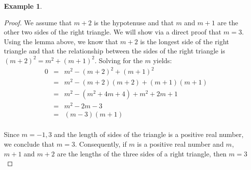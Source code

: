 \documentclass{book}
\theoremstyle{definition}
\newtheorem{example}{Example}[definition]
\theoremstyle{remark}
\begin{document}
\begin{example}
\begin{proof}
    We assume that $m+2$ is the hypotenuse and that $m$ and $m+1$ are the other two sides of the right triangle. We will show via a direct proof that $m=3$. \\
    
    Using the lemma above, we know that $m+2$ is the longest side of the right triangle and that the relationship between the sides of the right triangle is $(m + 2)^2 = m^2 + (m + 1)^2$. Solving for the $m$ yields: \\
    
    \begin{eqnarray}
    	0 & = & m^2 - (m+2)^2 + (m+1)^2 \nonumber \\
    	& = & m^2 - (m + 2)(m + 2) + (m + 1)(m + 1) \nonumber \\
    	& = & m^2 - (m^2 + 4m + 4) + m^2 + 2m + 1 \nonumber \\
    	& = & m^2 -2m - 3 \nonumber \\
    	& = & (m-3)(m+1) \nonumber \\ 
    \end{eqnarray}
    
    Since $m = -1,3$ and the length of sides of the triangle is a positive real number, we conclude that $m=3$. Consequently, if $m$ is a positive real number and $m$, $m+1$ and $m+2$ are the lengths of the three sides of a right triangle, then $m=3$ 
\end{proof}
\end{example}
\end{document}
